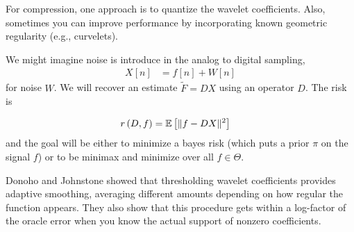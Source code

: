 \documentclass{article}
\begin{document}
For compression, one approach is to quantize the wavelet coefficients. Also,
sometimes you can improve performance by incorporating known geometric
regularity (e.g., curvelets).

We might imagine noise is introduce in the analog to digital sampling,
\begin{align}
X\left[n\right] &= f\left[n\right] + W\left[n\right]
\end{align}
for noise $W$. We will recover an estimate $\tilde{F} = DX$ using an operator
$D$. The risk is

\begin{align}
r\left(D, f\right) &= \mathbb{E}\left[{\|f - DX\|^{2}}\right]
\end{align}
and the goal will be either to minimize a bayes risk (which puts a prior $\pi$
on the signal $f$) or to be minimax and minimize over all $f\in \Theta$.

Donoho and Johnstone showed that thresholding wavelet coefficients provides
adaptive smoothing, averaging different amounts depending on how regular the
function appears. They also show that this procedure gets within a log-factor of
the oracle error when you know the actual support of nonzero coefficients.
\end{document}
